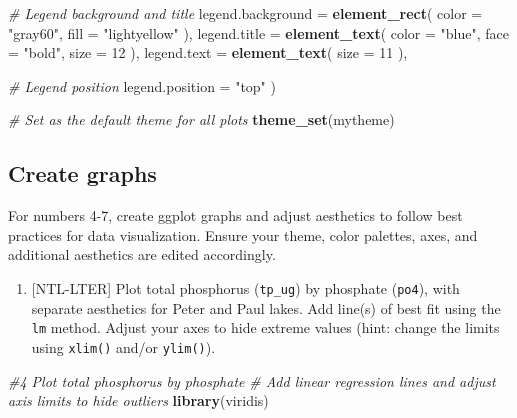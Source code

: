 \documentclass[
]{article}
\newenvironment{Shaded}{\begin{snugshade}}{\end{snugshade}}
\newcommand{\AttributeTok}[1]{\textcolor[rgb]{0.13,0.29,0.53}{#1}}
\newcommand{\CommentTok}[1]{\textcolor[rgb]{0.56,0.35,0.01}{\textit{#1}}}
\newcommand{\DecValTok}[1]{\textcolor[rgb]{0.00,0.00,0.81}{#1}}
\newcommand{\FunctionTok}[1]{\textcolor[rgb]{0.13,0.29,0.53}{\textbf{#1}}}
\newcommand{\NormalTok}[1]{#1}
\newcommand{\StringTok}[1]{\textcolor[rgb]{0.31,0.60,0.02}{#1}}
\providecommand{\tightlist}{%
  \setlength{\itemsep}{0pt}\setlength{\parskip}{0pt}}
\begin{document}
\begin{Shaded}
\begin{Highlighting}[]
    \CommentTok{\# Legend background and title}
    \AttributeTok{legend.background =} \FunctionTok{element\_rect}\NormalTok{(}
      \AttributeTok{color =} \StringTok{"gray60"}\NormalTok{,}
      \AttributeTok{fill =} \StringTok{"lightyellow"}
\NormalTok{    ),}
    \AttributeTok{legend.title =} \FunctionTok{element\_text}\NormalTok{(}
      \AttributeTok{color =} \StringTok{"blue"}\NormalTok{,}
      \AttributeTok{face =} \StringTok{"bold"}\NormalTok{,}
      \AttributeTok{size =} \DecValTok{12}
\NormalTok{    ),}
    \AttributeTok{legend.text =} \FunctionTok{element\_text}\NormalTok{(}
      \AttributeTok{size =} \DecValTok{11}
\NormalTok{    ),}
    
    \CommentTok{\# Legend position}
    \AttributeTok{legend.position =} \StringTok{"top"}
\NormalTok{  )}

\CommentTok{\# Set as the default theme for all plots}
\FunctionTok{theme\_set}\NormalTok{(mytheme)}
\end{Highlighting}
\end{Shaded}

\subsection{Create graphs}\label{create-graphs}

For numbers 4-7, create ggplot graphs and adjust aesthetics to follow
best practices for data visualization. Ensure your theme, color
palettes, axes, and additional aesthetics are edited accordingly.

\begin{enumerate}
\def\labelenumi{\arabic{enumi}.}
\setcounter{enumi}{3}
\tightlist
\item
  {[}NTL-LTER{]} Plot total phosphorus (\texttt{tp\_ug}) by phosphate
  (\texttt{po4}), with separate aesthetics for Peter and Paul lakes. Add
  line(s) of best fit using the \texttt{lm} method. Adjust your axes to
  hide extreme values (hint: change the limits using \texttt{xlim()}
  and/or \texttt{ylim()}).
\end{enumerate}

\begin{Shaded}
\begin{Highlighting}[]
\CommentTok{\#4 Plot total phosphorus by phosphate}
\CommentTok{\# Add linear regression lines and adjust axis limits to hide outliers}
\FunctionTok{library}\NormalTok{(viridis)}
\end{Highlighting}
\end{Shaded}
\end{document}
